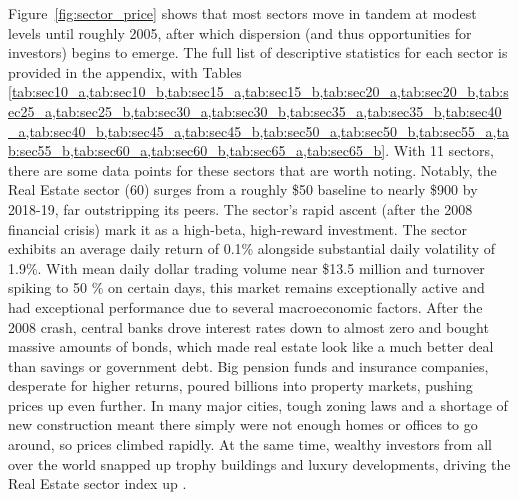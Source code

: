  \begin{table}[H]
    \centering
    \caption{\textit{Variance inflation factors}}
    \label{tab:vif}
\end{table}

Figure~\ref{fig:sector_price} shows that most sectors move in tandem at modest levels until roughly 2005, after which dispersion (and thus opportunities for investors) begins to emerge. The full list of descriptive statistics for each sector is provided in the appendix, with Tables \cref{tab:sec10_a,tab:sec10_b,tab:sec15_a,tab:sec15_b,tab:sec20_a,tab:sec20_b,tab:sec25_a,tab:sec25_b,tab:sec30_a,tab:sec30_b,tab:sec35_a,tab:sec35_b,tab:sec40_a,tab:sec40_b,tab:sec45_a,tab:sec45_b,tab:sec50_a,tab:sec50_b,tab:sec55_a,tab:sec55_b,tab:sec60_a,tab:sec60_b,tab:sec65_a,tab:sec65_b}. With 11 sectors, there are some data points for these sectors that are worth noting. Notably, the Real Estate sector (60) surges from a roughly \$50 baseline to nearly \$900 by 2018-19, far outstripping its peers. The sector's rapid ascent (after the 2008 financial crisis) mark it as a high-beta, high-reward investment. The sector exhibits an average daily return of 0.1\% alongside substantial daily volatility of 1.9\%. With mean daily dollar trading volume near \$13.5 million and turnover spiking to 50 \% on certain days, this market remains exceptionally active and had exceptional performance due to several macroeconomic factors. After the 2008 crash, central banks drove interest rates down to almost zero and bought massive amounts of bonds, which made real estate look like a much better deal than savings or government debt. Big pension funds and insurance companies, desperate for higher returns, poured billions into property markets, pushing prices up even further. In many major cities, tough zoning laws and a shortage of new construction meant there simply were not enough homes or offices to go around, so prices climbed rapidly. At the same time, wealthy investors from all over the world snapped up trophy buildings and luxury developments, driving the Real Estate sector index up \cite{cbre_2018}. 

